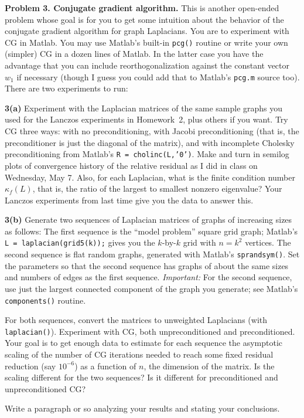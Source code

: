 
\par\bigskip
{\bf Problem 3. Conjugate gradient algorithm.}
This is another open-ended problem whose goal is for you to get some
intuition about the behavior of the conjugate gradient algorithm for graph Laplacians.
You are to experiment with CG in Matlab. You may use Matlab's built-in {\tt pcg()}
routine or write your own (simpler) CG in a dozen lines of Matlab.
In the latter case you have the advantage that you can include reorthogonalization
against the constant vector~$w_1$ if necessary 
(though I guess you could add that to Matlab's {\tt pcg.m} source too).
There are two experiments to run:
\par\medskip
{\bf 3(a)}
Experiment with the Laplacian matrices of the same sample graphs you
used for the Lanczos experiments in Homework~2, plus others if you want.
Try CG three ways:  with no preconditioning, with Jacobi preconditioning
(that is, the preconditioner is just the diagonal of the matrix), and
with incomplete Cholesky preconditioning from Matlab's {\tt R = cholinc(L,'0')}.
Make and turn in semilog plots of convergence history of the relative residual
as I did in class on Wednesday, May 7.  Also, for each Laplacian, what is the
finite condition number $\kappa_f(L)$, that is, the ratio of the largest to
smallest nonzero eigenvalue?  Your Lanczos experiments from last time give you
the data to answer this.
\par\medskip
{\bf 3(b)}
Generate two sequences of Laplacian matrices of graphs of increasing sizes as
follows:  The first sequence is the ``model problem'' square grid graph;
Matlab's {\tt L = laplacian(grid5(k));} gives you the $k$-by-$k$ grid with
$n=k^2$ vertices.  The second sequence is flat random graphs, generated with
Matlab's {\tt sprandsym()}.  Set the parameters so that the second sequence
has graphs of about the same sizes and numbers of edges as the first sequence.
{\em Important:} For the second sequence, use just the largest connected 
component of the graph you generate; see Matlab's {\tt components()} routine.
\par
For both sequences, convert the matrices to unweighted Laplacians (with {\tt laplacian()}).
Experiment with CG, both unpreconditioned and preconditioned.  Your goal is to get
enough data to estimate for each sequence the asymptotic scaling of the number of
CG iterations needed to reach some fixed residual reduction 
(say $10^{-6}$) as a function of $n$, the dimension of the matrix.  
Is the scaling different for the two sequences?
Is it different for preconditioned and unpreconditioned CG?
\par
Write a paragraph or so analyzing your results and stating your conclusions.


